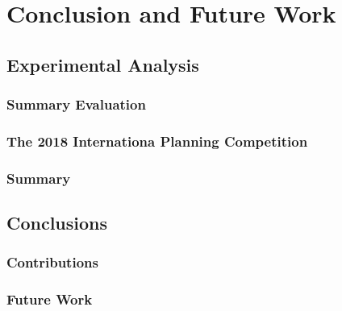 \chapter{Conclusion and Future Work }

\ifpdf
    \graphicspath{{Chapter6/Figs/Raster/}{Chapter6/Figs/PDF/}{Chapter6/Figs/}}
\else
    \graphicspath{{Chapter6/Figs/Vector/}{Chapter6/Figs/}}
\fi

\section{Experimental Analysis}

\subsection{Summary Evaluation}

\subsection{The 2018 Internationa Planning Competition}

\subsection{Summary}

\section{Conclusions}

\subsection{Contributions}

\subsection{Future Work}

